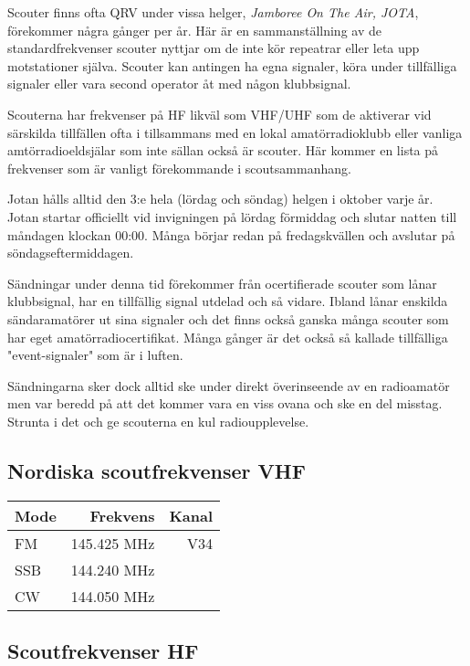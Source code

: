 Scouter finns ofta QRV under vissa helger, \textit{Jamboree On The Air, JOTA},
förekommer några gånger per år. Här är en sammanställning av de
standardfrekvenser scouter nyttjar om de inte kör repeatrar eller leta upp
motstationer själva. Scouter kan antingen ha egna signaler, köra under
tillfälliga signaler eller vara second operator åt med någon klubbsignal.

Scouterna har frekvenser på HF likväl som VHF/UHF som de aktiverar vid särskilda
tillfällen ofta i tillsammans med en lokal amatörradioklubb eller vanliga
amtörradioeldsjälar som inte sällan också är scouter. Här kommer en lista på
frekvenser som är vanligt förekommande i scoutsammanhang.

Jotan hålls alltid den 3:e hela (lördag och söndag) helgen i oktober varje år.
Jotan startar officiellt vid invigningen på lördag förmiddag och slutar natten
till måndagen klockan 00:00. Många börjar redan på fredagskvällen och avslutar
på söndagseftermiddagen.

Sändningar under denna tid förekommer från ocertifierade scouter som lånar
klubbsignal, har en tillfällig signal utdelad och så vidare. Ibland lånar
enskilda sändaramatörer ut sina signaler och det finns också ganska många
scouter som har eget amatörradiocertifikat. Många gånger är det också så
kallade tillfälliga "event-signaler" som är i luften.

Sändningarna sker dock alltid ske under direkt överinseende av en radioamatör
men var beredd på att det kommer vara en viss ovana och ske en del misstag.
Strunta i det och ge scouterna en kul radioupplevelse.

\subsection{Nordiska scoutfrekvenser VHF}

\begin{center}
\begin{tabular}{lrr}
	\textbf{Mode} & \textbf{Frekvens} & \textbf{Kanal} \\ \hline
	FM            &      145.425  MHz &   V34 \\
	SSB           &      144.240  MHz &  \\
	CW            &      144.050  MHz &
\end{tabular}
\end{center}

\subsection{Scoutfrekvenser HF}

